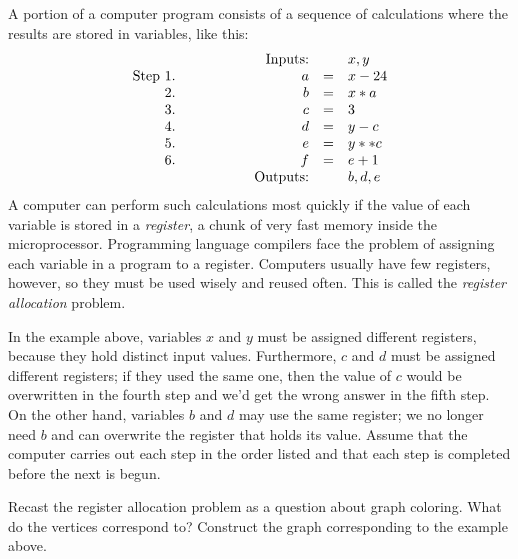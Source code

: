 \documentclass[12pt,twoside]{article}
\begin{document}




\begin{problem}{10} 
A portion of a computer program consists of a sequence of calculations
where the results are stored in variables, like this:
\[
\begin{array}{rrrcl}
&& \text{Inputs:} &  & x, y \\
\text{Step } 1. & \hspace{0.5in} & a & = & x - 24 \\
2. && b & = & x * a \\
3. && c & = & 3 \\
4. && d & = & y - c \\
5. && e & = & y ** c \\
6. && f & = & e + 1  \\
&& \text{Outputs:} & & b, d, e
\end{array}
\]
A computer can perform such calculations most quickly if the value of
each variable is stored in a \emph{register}, a chunk of very fast
memory inside the microprocessor.  Programming language compilers face
the problem of assigning each variable in a program to a register.
Computers usually have few registers, however, so they must be used
wisely and reused often.  This is called the \emph{register
  allocation} problem.

In the example above, variables $x$ and $y$ must be assigned different
registers, because they hold distinct input values.  Furthermore, $c$
and $d$ must be assigned different registers; if they used the same
one, then the value of $c$ would be overwritten in the fourth step and
we'd get the wrong answer in the fifth step.  On the other hand,
variables $b$ and $d$ may use the same register; we no longer need $b$ and can overwrite the register that holds its
value.  Assume that the computer carries out each step in the order
listed and that each step is completed before the next is begun.

\bparts

 Recast the register allocation problem as a question
about graph coloring.  What do the vertices correspond to?  Construct
the graph corresponding to the example above.

\end{problem}
\end{document}
